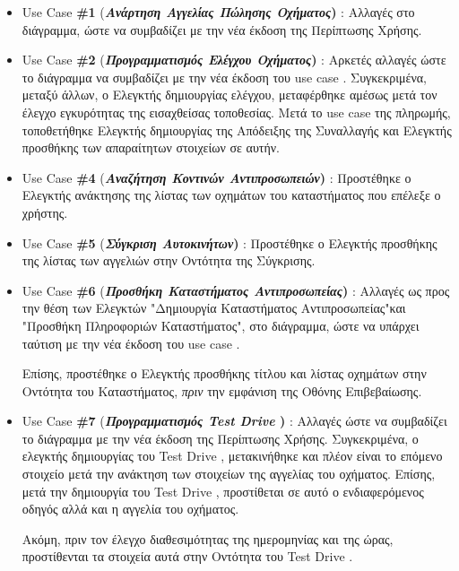 \documentclass{../ol-softwaremanual}
\begin{document}
	\begin{itemize}
	\item \en Use Case  \textbf{\#1} (\gr \textbf{\textit{Ανάρτηση Αγγελίας Πώλησης Οχήματος}) }: Αλλαγές στο διάγραμμα, ώστε να συμβαδίζει με την νέα έκδοση της Περίπτωσης Χρήσης.

	
	\item \en Use Case  \textbf{\#2} (\gr \textbf{\textit{Προγραμματισμός Ελέγχου Οχήματος}) }: Αρκετές αλλαγές ώστε το διάγραμμα να συμβαδίζει με την νέα έκδοση του \en use case \gr. Συγκεκριμένα, μεταξύ άλλων, ο Ελεγκτής δημιουργίας ελέγχου, μεταφέρθηκε αμέσως μετά τον έλεγχο εγκυρότητας της εισαχθείσας τοποθεσίας. Μετά το \en use case \gr της πληρωμής, τοποθετήθηκε Ελεγκτής δημιουργίας της Απόδειξης της Συναλλαγής και Ελεγκτής προσθήκης των απαραίτητων στοιχείων σε αυτήν.
	
	\item \en Use Case  \textbf{\#4} (\gr \textbf{\textit{Αναζήτηση Κοντινών Αντιπροσωπειών}) }: Προστέθηκε ο Ελεγκτής ανάκτησης της λίστας των οχημάτων του καταστήματος που επέλεξε ο χρήστης.
	
	\item \en Use Case  \textbf{\#5} (\gr \textbf{\textit{Σύγκριση Αυτοκινήτων}) }: Προστέθηκε ο Ελεγκτής προσθήκης της λίστας των αγγελιών στην Οντότητα της Σύγκρισης.
	
	\item \en Use Case  \textbf{\#6} (\gr \textbf{\textit{Προσθήκη Καταστήματος Αντιπροσωπείας}) }: Αλλαγές ως προς την θέση των Ελεγκτών \en"\gr Δημιουργία Καταστήματος Αντιπροσωπείας\en"\gr και \en"\gr Προσθήκη Πληροφοριών Καταστήματος\en"\gr, στο διάγραμμα, ώστε να υπάρχει ταύτιση με την νέα έκδοση του \en use case \gr. 
	
	Επίσης, προστέθηκε ο Ελεγκτής προσθήκης τίτλου και λίστας οχημάτων στην Οντότητα του Καταστήματος, \textit{πριν} την εμφάνιση της Οθόνης Επιβεβαίωσης.
	
	\item \en Use Case  \textbf{\#7} (\gr \textbf{\textit{Προγραμματισμός \en Test Drive \gr}) }: Αλλαγές ώστε να συμβαδίζει το διάγραμμα με την νέα έκδοση της Περίπτωσης Χρήσης. Συγκεκριμένα, ο ελεγκτής δημιουργίας του \en Test Drive \gr, μετακινήθηκε και πλέον είναι το επόμενο στοιχείο μετά την ανάκτηση των στοιχείων της αγγελίας του οχήματος. Επίσης, μετά την δημιουργία του \en Test Drive \gr, προστίθεται σε αυτό ο ενδιαφερόμενος οδηγός αλλά και η αγγελία του οχήματος. 
	
	Ακόμη, πριν τον έλεγχο διαθεσιμότητας της ημερομηνίας και της ώρας, προστίθενται τα στοιχεία αυτά στην Οντότητα του \en Test Drive \gr .
	

\end{itemize}
\end{document}
